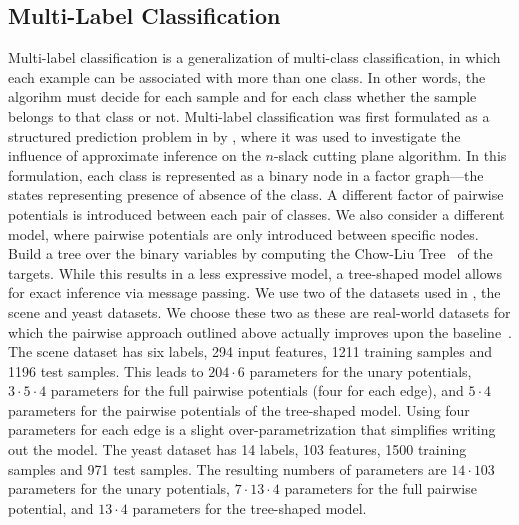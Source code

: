 \subsection{Multi-Label Classification}
Multi-label classification is a generalization of multi-class classification,
in which each example can be associated with more than one class. In other
words, the algorihm must decide for each sample and for each class whether the
sample belongs to that class or not.
Multi-label classification was first formulated as a structured prediction problem
in by \citet{finley2008training}, where it was used to investigate the influence of
approximate inference on the $n$-slack cutting plane algorithm. In this formulation,
each class is represented as a binary node in a factor graph---the states representing
presence of absence of the class. A different factor of pairwise potentials is introduced
between each pair of classes.
We also consider a different model, where pairwise potentials are only
introduced between specific nodes. Build a tree over the binary variables by
computing the Chow-Liu Tree~\citep{chow1968approximating} of the targets. While
this results in a less expressive model, a tree-shaped model allows for exact
inference via message passing.
We use two of the datasets used in \citet{finley2008training}, the scene
and yeast datasets. We choose these two as these are real-world datasets for
which the pairwise approach outlined above actually improves upon the
baseline~\citep{finley2008training}.
The scene dataset has six labels, 294 input features, 1211 training samples and
1196 test samples. This leads to $204 \cdot 6$ parameters for the unary potentials,
$3 \cdot 5 \cdot 4$ parameters for the full pairwise potentials (four for each edge), and
$5 \cdot 4$ parameters for the pairwise potentials of the tree-shaped model.
Using four parameters for each edge is a slight over-parametrization that
simplifies writing out the model.
The yeast dataset has 14 labels, 103 features, 1500 training samples and 971
test samples. The resulting numbers of parameters are $14 \cdot 103$ parameters
for the unary potentials, $7 \cdot 13 \cdot 4$ parameters for the full pairwise
potential, and $13 \cdot 4$ parameters for the tree-shaped model.

